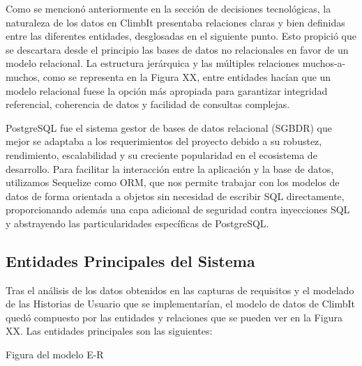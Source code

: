 Como se mencionó anteriormente en la sección de decisiones tecnológicas, la naturaleza de los datos en ClimbIt presentaba 
relaciones claras y bien definidas entre las diferentes entidades, desglosadas en el siguiente punto. Esto propició que se
descartara desde el principio las bases de datos no relacionales en favor de un modelo relacional. La estructura jerárquica 
y las múltiples relaciones muchos-a-muchos, como se representa en la Figura XX, entre entidades hacían que un modelo relacional fuese la opción más apropiada 
para garantizar integridad referencial, coherencia de datos y facilidad de consultas complejas.

PostgreSQL fue el sistema gestor de bases de datos relacional (SGBDR) que mejor se adaptaba a los requerimientos del proyecto debido
a su robustez, rendimiento, escalabilidad y su creciente popularidad en el ecosistema de desarrollo. Para facilitar la interacción 
entre la aplicación y la base de datos, utilizamos Sequelize como ORM, que nos permite trabajar con los modelos de datos de forma 
orientada a objetos sin necesidad de escribir SQL directamente, proporcionando además una capa adicional de seguridad contra 
inyecciones SQL y abstrayendo las particularidades específicas de PostgreSQL.

\subsection{Entidades Principales del Sistema}

Tras el análisis de los datos obtenidos en las capturas de requisitos y el modelado de las Historias de Usuario que se 
implementarían, el modelo de datos de ClimbIt quedó compuesto por las entidades y relaciones que se pueden ver en
la Figura XX. Las entidades principales son las siguientes:

{ Figura del modelo E-R }

